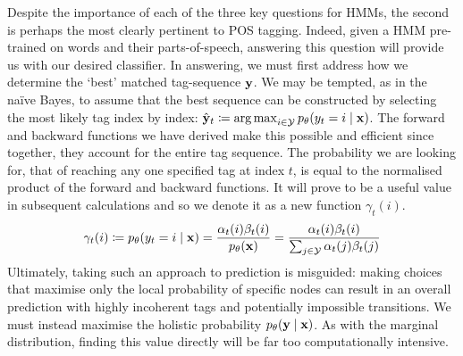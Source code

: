 \documentclass[../main.tex]{subfiles}
\begin{document}
Despite the importance of each of the three key questions for HMMs, the second is perhaps the most clearly pertinent to POS tagging. Indeed, given a HMM pre-trained on words and their parts-of-speech, answering this question will provide us with our desired classifier.
In answering, we must first address how we determine the `best' matched tag-sequence $\mathbf{y}$.
We may be tempted, as in the na{\"i}ve Bayes, to assume that the best sequence can be constructed by selecting the most likely tag index by index: $\hat{\mathbf{y}}_t \coloneqq \operatorname*{arg\,max}_{i \in \mathcal{Y}} p_\theta(y_t = i \mid \mathbf{x})$.
The forward and backward functions we have derived make this possible and efficient since together, they account for the entire tag sequence.
The probability we are looking for, that of reaching any one specified tag at index $t$, is equal to the normalised product of the forward and backward functions. It will prove to be a useful value in subsequent calculations and so we denote it as a new function $\gamma_t(i)$.
\begin{equation*}
\gamma_t(i) \coloneqq p_\theta(y_t = i \mid \mathbf{x}) = \frac{\alpha_t(i)\beta_t(i)}{p_\theta(\mathbf{x})} = \frac{\alpha_t(i)\beta_t(i)}{\sum_{j \in \mathcal{Y}}\alpha_t(j) \beta_t(j)}
\end{equation*}
Ultimately, taking such an approach to prediction is misguided: making choices that maximise only the local probability of specific nodes can result in an overall prediction with highly incoherent tags and potentially impossible transitions.
We must instead maximise the holistic probability $p_\theta(\mathbf{y} \mid \mathbf{x})$.
As with the marginal distribution, finding this value directly will be far too computationally intensive.
\end{document}

